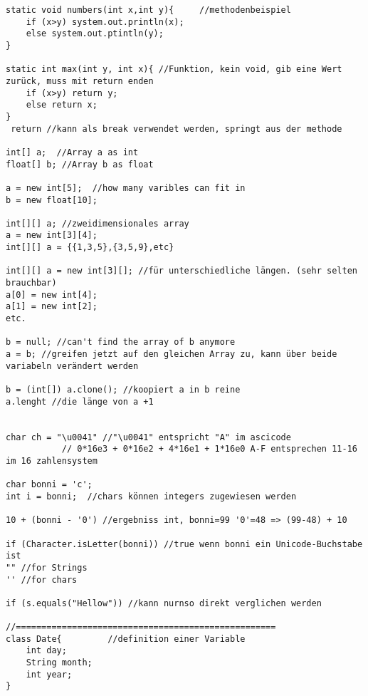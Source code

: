 \documentclass[a4paper,12pt]{article}
\begin{document}
\begin{lstlisting}
static void numbers(int x,int y){     //methodenbeispiel
	if (x>y) system.out.println(x);
	else system.out.ptintln(y);
}

static int max(int y, int x){ //Funktion, kein void, gib eine Wert zurück, muss mit return enden
	if (x>y) return y;
	else return x;
}
 return //kann als break verwendet werden, springt aus der methode

int[] a;  //Array a as int
float[] b; //Array b as float

a = new int[5];  //how many varibles can fit in
b = new float[10]; 

int[][] a; //zweidimensionales array
a = new int[3][4];
int[][] a = {{1,3,5},{3,5,9},etc}

int[][] a = new int[3][]; //für unterschiedliche längen. (sehr selten brauchbar)
a[0] = new int[4];
a[1] = new int[2];
etc.

b = null; //can't find the array of b anymore
a = b; //greifen jetzt auf den gleichen Array zu, kann über beide variabeln verändert werden

b = (int[]) a.clone(); //koopiert a in b reine
a.lenght //die länge von a +1


char ch = "\u0041" //"\u0041" entspricht "A" im ascicode
		   // 0*16e3 + 0*16e2 + 4*16e1 + 1*16e0 A-F entsprechen 11-16 im 16 zahlensystem

char bonni = 'c';
int i = bonni;  //chars können integers zugewiesen werden

10 + (bonni - '0') //ergebniss int, bonni=99 '0'=48 => (99-48) + 10

if (Character.isLetter(bonni)) //true wenn bonni ein Unicode-Buchstabe ist
"" //for Strings
'' //for chars

if (s.equals("Hellow")) //kann nurnso direkt verglichen werden

//===================================================
class Date{         //definition einer Variable
	int day;
	String month;
	int year;
}

\end{lstlisting}
\end{document}
